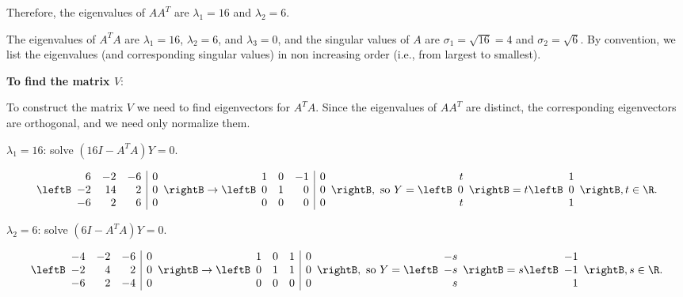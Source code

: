 \begin{solution}
Therefore, the eigenvalues of $AA^T$ are $\lambda_1=16$ and $\lambda_2=6$.

The eigenvalues of $A^TA$ are $\lambda_1=16$, $\lambda_2=6$, and
$\lambda_3=0$, and the singular values of $A$ are $\sigma_1=\sqrt{16}=4$ and
$\sigma_2=\sqrt{6}$.
By convention, we list the eigenvalues (and corresponding singular values)
in non increasing order (i.e., from largest to smallest).

{\bf To find the matrix $V$}:

To construct the matrix $V$ we need to find eigenvectors for $A^TA$.
Since the eigenvalues of $AA^T$ are distinct, the corresponding
eigenvectors are orthogonal, and we need only normalize them.

$\lambda_1=16$: solve $(16I-A^TA)Y= 0$.

\[ \leftB\begin{array}{rrr|r}
6 & -2 & -6 & 0 \\ -2 & 14 & 2 & 0 \\ -6 & 2 & 6 & 0
\end{array}\rightB
\rightarrow
\leftB\begin{array}{rrr|r}
1 & 0 & -1 & 0 \\ 0 & 1 & 0 & 0 \\ 0 & 0 & 0 & 0
\end{array}\rightB,
\mbox{ so }
Y=\leftB\begin{array}{r} t \\ 0 \\ t \end{array}\rightB
=t\leftB\begin{array}{r} 1 \\ 0 \\ 1 \end{array}\rightB,
t\in \R. \]

$\lambda_2=6$: solve $(6I-A^TA)Y= 0$.

\[ \leftB\begin{array}{rrr|r}
-4 & -2 & -6 & 0 \\ -2 & 4 & 2 & 0 \\ -6 & 2 & -4 & 0
\end{array}\rightB
\rightarrow
\leftB\begin{array}{rrr|r}
1 & 0 & 1 & 0 \\ 0 & 1 & 1 & 0 \\ 0 & 0 & 0 & 0
\end{array}\rightB,
\mbox{ so }
Y=\leftB\begin{array}{r} -s \\ -s \\ s \end{array}\rightB
=s\leftB\begin{array}{r} -1 \\ -1 \\ 1 \end{array}\rightB,
s\in \R. \]


\end{solution}
